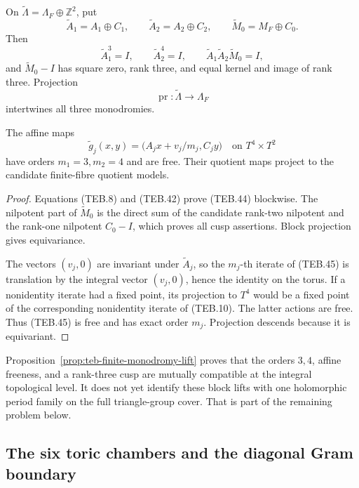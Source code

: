 \begin{proposition}
\label{prop:teb-finite-monodromy-lift}
On \(\widetilde\Lambda=\Lambda_F\oplus\mathbb Z^2\), put
\[
 \widetilde A_1=A_1\oplus C_1,
 \qquad
 \widetilde A_2=A_2\oplus C_2,
 \qquad
 \widetilde M_0=M_F\oplus C_0.
 \tag{TEB.43}
\]
Then
\[
 \widetilde A_1^3=I,\qquad
 \widetilde A_2^4=I,\qquad
 \widetilde A_1\widetilde A_2\widetilde M_0=I,          \tag{TEB.44}
\]
and \(\widetilde M_0-I\) has square zero, rank three, and equal kernel and
image of rank three.  Projection
\[
 \operatorname{pr}:\widetilde\Lambda\longrightarrow\Lambda_F
\]
intertwines all three monodromies.

The affine maps
\[
 \widetilde g_j(x,y)=
 \bigl(A_jx+v_j/m_j,C_jy\bigr)
 \quad\text{on }T^4\times T^2                          \tag{TEB.45}
\]
 have orders \(m_1=3,m_2=4\) and are free.  Their quotient maps project to the
candidate finite-fibre quotient models.
\end{proposition}

\begin{proof}
Equations (TEB.8) and (TEB.42) prove (TEB.44) blockwise.  The nilpotent part
of \(\widetilde M_0\) is the direct sum of the candidate rank-two nilpotent
and the rank-one nilpotent \(C_0-I\), which proves all cusp assertions.
Block projection gives equivariance.

The vectors \((v_j,0)\) are invariant under \(\widetilde A_j\), so the
\(m_j\)-th iterate of (TEB.45) is translation by the integral vector
\((v_j,0)\), hence the identity on the torus.  If a nonidentity iterate had a
fixed point, its projection to \(T^4\) would be a fixed point of the
corresponding nonidentity iterate of (TEB.10).  The latter actions are free.
Thus (TEB.45) is free and has exact order \(m_j\).  Projection descends because
it is equivariant.
\end{proof}

Proposition~\ref{prop:teb-finite-monodromy-lift} proves that the orders
\(3,4\), affine freeness, and a rank-three cusp are mutually compatible at
the integral topological level.  It does not yet identify these block lifts
with one holomorphic period family on the full triangle-group cover.  That is
part of the remaining problem below.

\subsection{The six toric chambers and the diagonal Gram boundary}
\label{subsec:teb-weyl-chambers}

